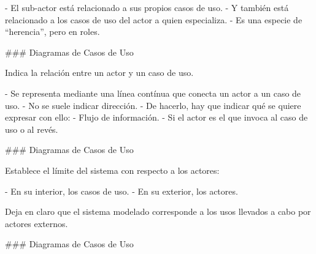 - El sub-actor está relacionado a sus propios casos de uso.
- Y también está relacionado a los casos de uso del actor a quien especializa.
- Es una especie de ``herencia'', pero en roles.

\columnsend

### Diagramas de Casos de Uso


\columnsbegin


\vspace{-5mm}
\centering{}

 Indica la relación entre un actor y un caso de uso.\newline

\columnsend

- Se representa mediante una línea contínua que conecta un actor a un caso de uso.
- No se suele indicar dirección.
- De hacerlo, hay que indicar qué se quiere expresar con ello:
    - Flujo de información.
    - Si el actor es el que invoca al caso de uso o al revés.

### Diagramas de Casos de Uso


\columnsbegin


\centering{}

 Establece el límite del sistema con respecto a los actores:

- En su interior, los casos de uso.
- En su exterior, los actores.

Deja en claro que el sistema modelado corresponde a los usos llevados a cabo por actores externos.

\columnsend

### Diagramas de Casos de Uso

